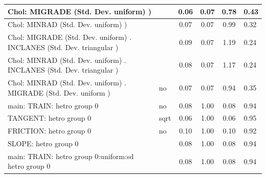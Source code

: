 \begin{table}
\begin{center}
\begin{tabular}{|l|l|c|c|c|l|}
			\hline
			 Chol: MIGRADE (Std. Dev. uniform) ) &  & 0.06 & 0.07 & 0.78 & 0.43 \\
			\hline
			 Chol: MINRAD (Std. Dev. uniform) ) &  & 0.07 & 0.07 & 0.99 & 0.32 \\
			\hline
			 Chol: MIGRADE (Std. Dev. uniform) . INCLANES (Std. Dev.   triangular ) &  & 0.09 & 0.07 & 1.19 & 0.24 \\
			\hline
			 Chol: MINRAD (Std. Dev. uniform) . INCLANES (Std. Dev.   triangular ) &  & 0.08 & 0.07 & 1.17 & 0.24 \\
			\hline
			 Chol: MINRAD (Std. Dev. uniform) . MIGRADE (Std. Dev.   uniform ) & no & 0.07 & 0.07 & 0.94 & 0.35 \\
			\hline
			main: TRAIN: hetro group 0 & no & 0.08 & 1.00 & 0.08 & 0.94 \\
			\hline
			TANGENT: hetro group 0 & sqrt & 0.06 & 1.00 & 0.06 & 0.95 \\
			\hline
			FRICTION: hetro group 0 & no & 0.10 & 1.00 & 0.10 & 0.92 \\
			\hline
			SLOPE: hetro group 0 &  & 0.08 & 1.00 & 0.08 & 0.94 \\
			\hline
			main: TRAIN: hetro group 0:uniform:sd  hetro group 0 &  & 0.08 & 1.00 & 0.08 & 0.94 \\
			\hline
		\end{tabular}
	\end{center}
\end{table}
